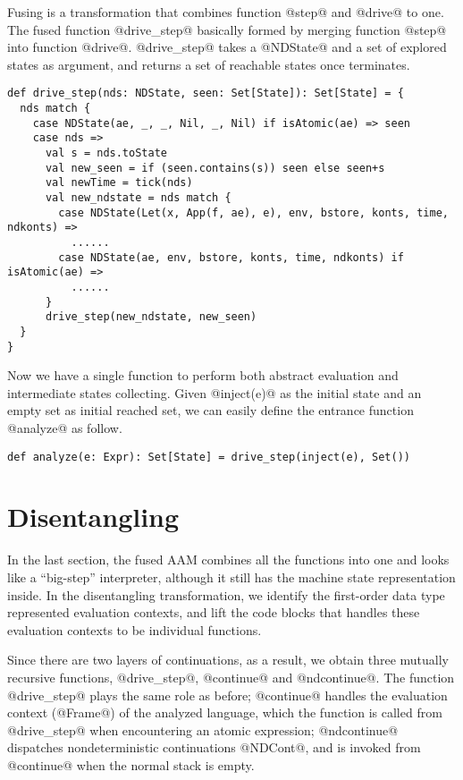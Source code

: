 \documentclass[acmsmall,review,anonymous]{acmart}\settopmatter{printfolios=true,printccs=false,printacmref=false}
\begin{document}
Fusing is a transformation that combines function @step@ and @drive@ to one.
The fused function @drive_step@ basically formed by merging function
@step@ into function @drive@.
@drive_step@ takes a @NDState@ and a set of explored states as argument,
and returns a set of reachable states once terminates.

\begin{lstlisting}
def drive_step(nds: NDState, seen: Set[State]): Set[State] = {
  nds match {
    case NDState(ae, _, _, Nil, _, Nil) if isAtomic(ae) => seen
    case nds =>
      val s = nds.toState
      val new_seen = if (seen.contains(s)) seen else seen+s
      val newTime = tick(nds)
      val new_ndstate = nds match {
        case NDState(Let(x, App(f, ae), e), env, bstore, konts, time, ndkonts) =>
          ......
        case NDState(ae, env, bstore, konts, time, ndkonts) if isAtomic(ae) =>
          ......
      }
      drive_step(new_ndstate, new_seen)
  }
}
\end{lstlisting}

Now we have a single function to perform both abstract evaluation and intermediate
states collecting. Given @inject(e)@ as the initial state and an empty set as
initial reached set, we can easily define the entrance function @analyze@ as follow.

\begin{lstlisting}
def analyze(e: Expr): Set[State] = drive_step(inject(e), Set())
\end{lstlisting}

\section{Disentangling} \label{disen}

In the last section, the fused AAM combines all the functions into one and
looks like a ``big-step'' interpreter, although it still has the machine
state representation inside.
In the disentangling transformation, we
identify the first-order data type represented evaluation contexts,
and lift the code blocks that handles these evaluation contexts to be individual functions.

Since there are two layers of continuations, as a result,
we obtain three mutually recursive functions, @drive_step@,
@continue@ and @ndcontinue@. The function @drive_step@ plays the same
role as before; @continue@ handles the evaluation context (@Frame@) of the analyzed
language, which the function is called from @drive_step@ when encountering an atomic
expression; @ndcontinue@ dispatches nondeterministic continuations @NDCont@,
and is invoked from @continue@ when the normal stack is empty.
\end{document}
